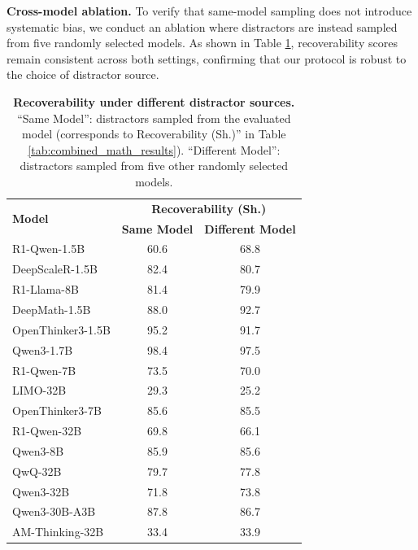 \documentclass{article} %
\begin{document}
\textbf{Cross-model ablation.} To verify that same-model sampling does not introduce systematic bias, we conduct an ablation where distractors are instead sampled from five randomly selected models. As shown in Table \ref{tab:ablation_recoverability_comparison}, recoverability scores remain consistent across both settings, confirming that our protocol is robust to the choice of distractor source.

\begin{table}[H]
  \centering
  \begin{tabular}{lcc}
    \toprule
    \multirow{2}{*}{\textbf{Model}} & \multicolumn{2}{c}{\textbf{Recoverability (Sh.)}} \\
     & \textbf{Same Model} & \textbf{Different Model} \\
    \midrule
    R1-Qwen-1.5B  & 60.6 & 68.8 \\
    DeepScaleR-1.5B       & 82.4 & 80.7 \\
    R1-Llama-8B           & 81.4 & 79.9 \\
    DeepMath-1.5B         & 88.0 & 92.7 \\
    OpenThinker3-1.5B     & 95.2 & 91.7 \\
    Qwen3-1.7B            & 98.4 & 97.5 \\
    \midrule
    R1-Qwen-7B    & 73.5 & 70.0 \\
    LIMO-32B              & 29.3 & 25.2 \\
    OpenThinker3-7B       & 85.6 & 85.5 \\
    R1-Qwen-32B   & 69.8 & 66.1 \\
    \midrule
    Qwen3-8B              & 85.9 & 85.6 \\
    QwQ-32B               & 79.7 & 77.8 \\
    Qwen3-32B             & 71.8 & 73.8 \\
    Qwen3-30B-A3B         & 87.8 & 86.7 \\
    AM-Thinking-32B       & 33.4 & 33.9 \\
    \bottomrule
  \end{tabular}
  \caption{\textbf{Recoverability under different distractor sources.} ``Same Model'': distractors sampled from the evaluated model (corresponds to Recoverability (Sh.)'' in Table \ref{tab:combined_math_results}). ``Different Model'': distractors sampled from five other randomly selected models.}
  \label{tab:ablation_recoverability_comparison}
\end{table}
\end{document}
